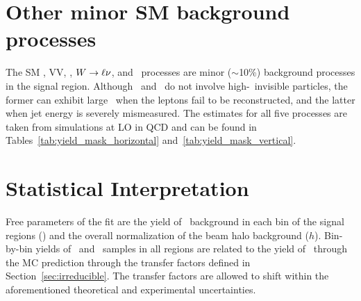 \section{Other minor SM background processes}
\label{sec:minorsm}
The SM \ttg, VV\Pgg, \zllg, ${W}\to\ell\nu$, and \gj\ processes are minor ($\sim$10\%) background processes in the signal region. 
Although \zllg\ and \gj\ do not involve high-\pt\ invisible particles, the former can exhibit large \met\ when the leptons fail to be reconstructed, and the latter when jet energy is severely mismeasured. 
The estimates for all five processes are taken from \MGvATNLO simulations at LO in QCD and can be found in Tables~\ref{tab:yield_mask_horizontal} and~\ref{tab:yield_mask_vertical}.

\section{Statistical Interpretation}
\label{sec:interpretation}

Free parameters of the fit are the yield of \zinvg\ background in each bin of the signal regions (\NZg[i]) and the overall normalization of the beam halo background ($h$). 
Bin-by-bin yields of \wlng\ and \zllg\ samples in all regions are related to the yield of \zinvg\ through the MC prediction through the transfer factors defined in Section~\ref{sec:irreducible}. 
The transfer factors are allowed to shift within the aforementioned theoretical and experimental uncertainties.


